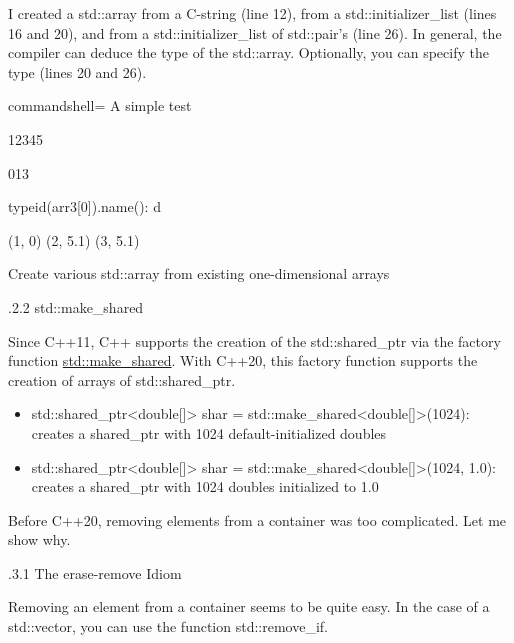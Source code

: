 I created a std::array from a C-string (line 12), from a std::initializer\_list (lines 16 and 20), and from a std::initializer\_list of std::pair’s (line 26). In general, the compiler can deduce the type of the std::array. Optionally, you can specify the type (lines 20 and 26).

\begin{tcblisting}{commandshell={}}
A simple test

12345

013

typeid(arr3[0]).name(): d

(1, 0)
(2, 5.1)
(3, 5.1)
\end{tcblisting}

\begin{center}
Create various std::array from existing one-dimensional arrays
\end{center}

.2.2\hspace{0.2cm} std::make\_shared

Since C++11, C++ supports the creation of the std::shared\_ptr via the factory function \href{https://en.cppreference.com/w/cpp/memory/shared_ptr/make_shared}{std::make\_shared}. With C++20, this factory function supports the creation of arrays of std::shared\_ptr.

\begin{itemize}
\item 
std::shared\_ptr<double[]> shar = std::make\_shared<double[]>(1024): creates a shared\_ptr with 1024 default-initialized doubles

\item 
std::shared\_ptr<double[]> shar = std::make\_shared<double[]>(1024, 1.0): creates a shared\_ptr with 1024 doubles initialized to 1.0
\end{itemize}


Before C++20, removing elements from a container was too complicated. Let me show why.

.3.1\hspace{0.2cm} The erase-remove Idiom

Removing an element from a container seems to be quite easy. In the case of a std::vector, you can use the function std::remove\_if.

